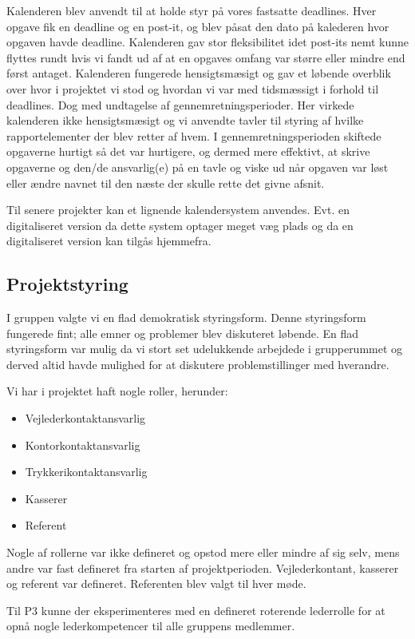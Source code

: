 Kalenderen blev anvendt til at holde styr p\aa{} vores fastsatte deadlines. Hver opgave fik en deadline og en post-it, og blev p\aa{}sat den dato p\aa{} kalederen hvor opgaven havde deadline.
Kalenderen gav stor fleksibilitet idet post-its nemt kunne flyttes rundt hvis vi fandt ud af at en opgaves omfang var st\o{}rre eller mindre end f\o{}rst antaget.
Kalenderen fungerede hensigtsm\ae{}sigt og gav et l\o{}bende overblik over hvor i projektet vi stod og hvordan vi var med tidsm\ae{}ssigt i forhold til deadlines. 
Dog med undtagelse af gennemretningsperioder.
Her virkede kalenderen ikke hensigtsm\ae{}sigt og vi anvendte tavler til styring af hvilke rapportelementer der blev retter af hvem.
I gennemretningsperioden skiftede opgaverne hurtigt s\aa{} det var hurtigere, og dermed mere effektivt, at skrive opgaverne og den/de ansvarlig(e) p\aa{} en tavle og viske ud n\aa{}r opgaven var l\o{}st eller \ae{}ndre navnet til den n\ae{}ste der skulle rette det givne afsnit.

Til senere projekter kan et lignende kalendersystem anvendes. Evt. en digitaliseret version da dette system optager meget v\ae{}g plads og da en digitaliseret version kan tilg\aa{}s hjemmefra. 

\subsection{Projektstyring}
I gruppen valgte vi en flad demokratisk styringsform.
Denne styringsform fungerede fint; alle emner og problemer blev diskuteret l\o{}bende.
En flad styringsform var mulig da vi stort set udelukkende arbejdede i grupperummet og derved altid havde mulighed for at diskutere problemstillinger med hverandre. 

Vi har i projektet haft nogle roller, herunder:
\begin{itemize}
\item Vejlederkontaktansvarlig
\item Kontorkontaktansvarlig
\item Trykkerikontaktansvarlig
\item Kasserer
\item Referent
\end{itemize}
Nogle af rollerne var ikke defineret og opstod mere eller mindre af sig selv, mens andre var fast defineret fra starten af projektperioden. Vejlederkontant, kasserer og referent var defineret. Referenten blev valgt til hver m\o{}de. 

Til P3 kunne der eksperimenteres med en defineret roterende lederrolle for at opn\aa{} nogle lederkompetencer til alle gruppens medlemmer. 